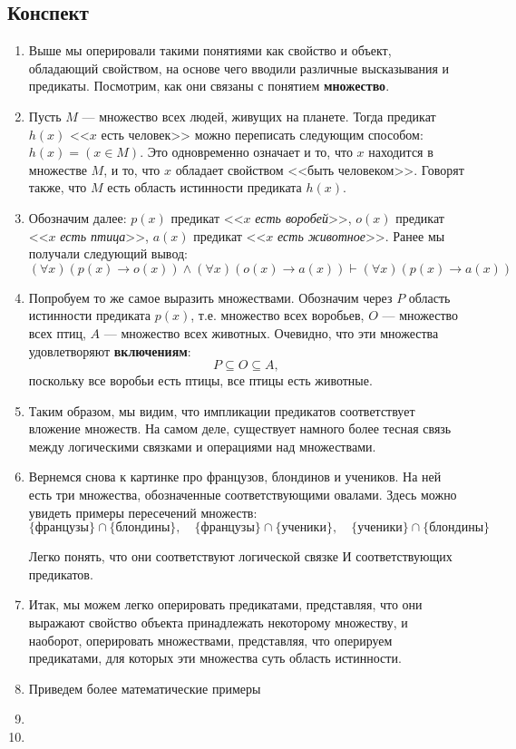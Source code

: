 \subsection{Конспект}
\begin{enumerate}
\item Выше мы оперировали такими понятиями как свойство и объект, обладающий свойством, на основе чего вводили различные высказывания и предикаты. Посмотрим, как они связаны с понятием \textbf{множество}.
\item Пусть $M$ --- множество всех людей, живущих на планете. Тогда предикат $h(x)$ <<$x$ есть человек>> можно переписать следующим способом: $h(x)=(x\in M)$. Это одновременно означает и то, что $x$ находится в множестве $M$, и то, что $x$ обладает свойством <<быть человеком>>. Говорят также, что $M$ есть область истинности предиката $h(x)$.
\item Обозначим далее: $p(x)$ предикат <<$x$ \textit{есть воробей}>>, $o(x)$ предикат <<$x$ \textit{есть птица}>>, $a(x)$ предикат <<$x$ \textit{есть животное}>>. Ранее мы получали следующий вывод:
$$
(\forall x) (p(x)\to o(x))\land (\forall x) (o(x)\to a(x))\vdash(\forall x) (p(x)\to a(x))
$$
\item Попробуем то же самое выразить множествами. Обозначим через $P$ область истинности предиката $p(x)$, т.е. множество всех воробьев, $O$ --- множество всех птиц, $A$ --- множество всех животных. Очевидно, что эти множества удовлетворяют \textbf{включениям}:
$$
P\subseteq O\subseteq A,
$$
поскольку все воробьи есть птицы, все птицы есть животные.
\item Таким образом, мы видим, что импликации предикатов соответствует вложение множеств. На самом деле, существует намного более тесная связь между логическими связками и операциями над множествами.
\item Вернемся снова к картинке про французов, блондинов и учеников. На ней есть три множества, обозначенные соответствующими овалами. Здесь можно увидеть примеры пересечений множеств:
$$
\{\mbox{французы}\}\cap\{\mbox{блондины}\}, \quad \{\mbox{французы}\}\cap\{\mbox{ученики}\},\quad\{\mbox{ученики}\}\cap\{\mbox{блондины}\}
$$

Легко понять, что они соответствуют логической связке И соответствующих предикатов.
\item Итак, мы можем легко оперировать предикатами, представляя, что они выражают свойство объекта принадлежать некоторому множеству, и наоборот, оперировать множествами, представляя, что оперируем предикатами, для которых эти множества суть область истинности.
\item Приведем более математические примеры
\item 
\item 



\end{enumerate}



